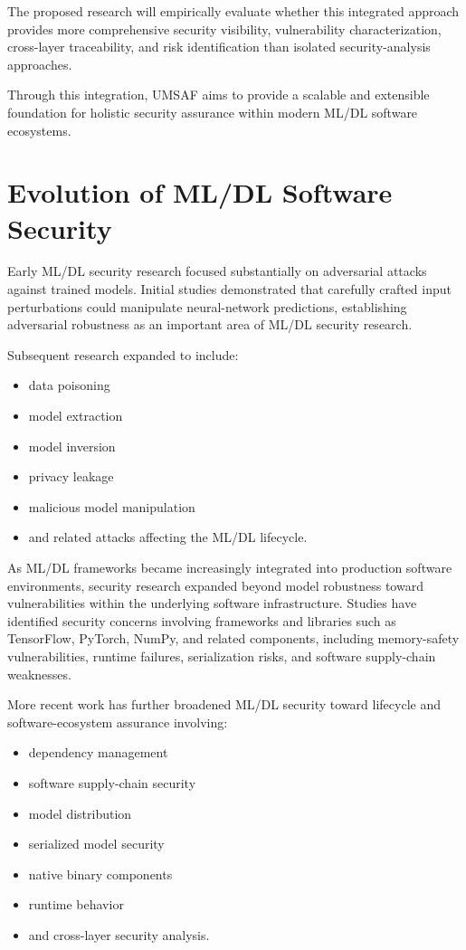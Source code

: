 \documentclass[
  12pt,
  letterpaper,
  oneside]{report}
\providecommand{\tightlist}{%
  \setlength{\itemsep}{0pt}\setlength{\parskip}{0pt}}
\begin{document}
The proposed research will empirically evaluate whether this integrated
approach provides more comprehensive security visibility, vulnerability
characterization, cross-layer traceability, and risk identification than
isolated security-analysis approaches.

Through this integration, UMSAF aims to provide a scalable and
extensible foundation for holistic security assurance within modern
ML/DL software ecosystems.

\section{Evolution of ML/DL Software Security}\label{811-evolution-of-mldl-software-security}

Early ML/DL security research focused substantially on adversarial
attacks against trained models. Initial studies demonstrated that
carefully crafted input perturbations could manipulate neural-network
predictions, establishing adversarial robustness as an important area of
ML/DL security research.

Subsequent research expanded to include:

\begin{itemize}
\tightlist
\item
  data poisoning
\item
  model extraction
\item
  model inversion
\item
  privacy leakage
\item
  malicious model manipulation
\item
  and related attacks affecting the ML/DL lifecycle.
\end{itemize}

As ML/DL frameworks became increasingly integrated into production
software environments, security research expanded beyond model
robustness toward vulnerabilities within the underlying software
infrastructure. Studies have identified security concerns involving
frameworks and libraries such as TensorFlow, PyTorch, NumPy, and related
components, including memory-safety vulnerabilities, runtime failures,
serialization risks, and software supply-chain weaknesses.

More recent work has further broadened ML/DL security toward lifecycle
and software-ecosystem assurance involving:

\begin{itemize}
\tightlist
\item
  dependency management
\item
  software supply-chain security
\item
  model distribution
\item
  serialized model security
\item
  native binary components
\item
  runtime behavior
\item
  and cross-layer security analysis.
\end{itemize}
\end{document}
